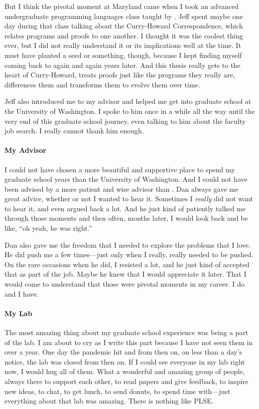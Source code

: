 \documentclass[ twoside,openright,titlepage,numbers=noenddot,headinclude,
                footinclude=true,cleardoublepage=empty,abstractoff,%
                BCOR=5mm,paper=letter,fontsize=11pt,letterpaper,%
                american,%
                ]{scrreprt}
\begin{document}
But I think the pivotal moment at Maryland came when I took an advanced undergraduate programming languages class
taught by . Jeff spent maybe one day during that class talking about the Curry-Howard Correspondence,
which relates programs and proofs to one another. I thought it was the coolest thing ever, but I did not really understand it
or its implications well at the time.
It must have planted a seed or something, though, because I kept finding myself coming back to again and again years later.
And this thesis really gets to the heart of Curry-Howard, treats proofs just like the programs they really are,
differences them and transforms them to evolve them over time.

Jeff also introduced me to my advisor and helped me get into graduate school at the University of Washington.
I spoke to him once in a while all the way until the very end of this graduate school journey,
even talking to him about the faculty job search.
I really cannot thank him enough.

\paragraph{My Advisor}
I could not have chosen a more beautiful and supportive place to spend my graduate school years than the University of Washington.
And I could not have been advised by a more patient and wise advisor than .
Dan always gave me great advice, whether or not I wanted to hear it.
Sometimes I \textit{really} did not want to hear it, and even argued back a lot.
And he just kind of patiently talked me through those moments and then often, months later,
I would look back and be like, ``oh yeah, he was right.''

Dan also gave me the freedom that I needed to explore the problems that I love.
He did push me a few times---just only when I really, really needed to be pushed.
On the rare occasions when he did, I resisted a lot, and he just kind of accepted that as part of the job.
Maybe he knew that I would appreciate it later.
That I would come to understand that those were pivotal moments in my career.
I do and I have.

\paragraph{My Lab}
The most amazing thing about my graduate school experience was being a part of the  lab.
I am about to cry as I write this part because I have not seen them in over a year.
One day the pandemic hit and from then on, on less than a day's notice, the lab was closed from then on.
If I could see everyone in my lab right now, I would hug all of them.
What a wonderful and amazing group of people, always there to support each other,
to read papers and give feedback, to inspire new ideas, to chat, to get lunch, to send donuts,
to spend time with---just everything about that lab was amazing.
There is nothing like PLSE.
\end{document}
